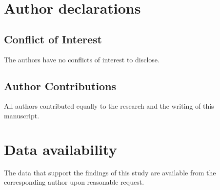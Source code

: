 \documentclass[aip,graphicx]{revtex4-2}
\begin{document}
	\section*{Author declarations}
	\subsection*{Conflict of Interest}
		The authors have no conflicts of interest to disclose.
	\subsection*{Author Contributions}
		All authors contributed equally to the research and the writing of this manuscript.
	\section*{Data availability}
		The data that support the findings of this study are available from the corresponding author upon reasonable request.
	
		
	
\end{document}
